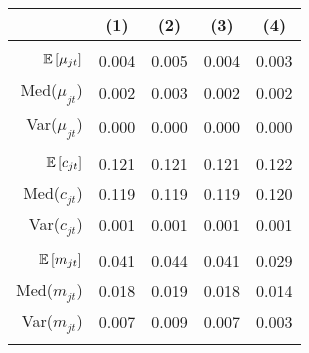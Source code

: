 \begin{tabular}{r|cccc}
 & (1) & (2) & (3) & (4) \\\hline &&&& \\ 
$\mathbb{E}\left[\mu_{jt}\right]$ & 0.004 & 0.005  & 0.004  & 0.003 \\ 
Med($\mu_{jt}$)& 0.002 & 0.003 & 0.002 & 0.002 \\
 Var($\mu_{jt}$)& 0.000 & 0.000 & 0.000 & 0.000 \\
 &&&&\\ 
$\mathbb{E}\left[c_{jt}\right]$ & 0.121 & 0.121  & 0.121  & 0.122 \\ 
Med($c_{jt}$)& 0.119 & 0.119 & 0.119 & 0.120 \\
 Var($c_{jt}$)& 0.001 & 0.001 & 0.001 & 0.001 \\
 &&&&\\ 
$\mathbb{E}\left[m_{jt}\right]$ & 0.041 & 0.044  & 0.041  & 0.029 \\ 
Med($m_{jt}$) & 0.018 & 0.019 & 0.018 & 0.014 \\
Var($m_{jt}$) & 0.007 & 0.009 & 0.007 & 0.003 \\
&&&&\\\hline 
\end{tabular}